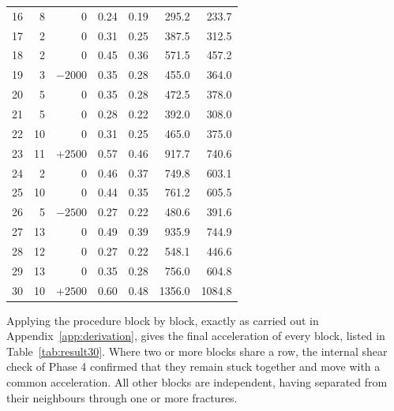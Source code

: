 \documentclass[11pt,a4paper]{article}
\begin{document}
\begin{longtable}{@{}rrrrrrr@{}}
16 & 8 & 0 & 0.24 & 0.19 & 295.2 & 233.7 \\
17 & 2 & 0 & 0.31 & 0.25 & 387.5 & 312.5 \\
18 & 2 & 0 & 0.45 & 0.36 & 571.5 & 457.2 \\
19 & 3 & $-2000$ & 0.35 & 0.28 & 455.0 & 364.0 \\
20 & 5 & 0 & 0.35 & 0.28 & 472.5 & 378.0 \\
21 & 5 & 0 & 0.28 & 0.22 & 392.0 & 308.0 \\
22 & 10 & 0 & 0.31 & 0.25 & 465.0 & 375.0 \\
23 & 11 & $+2500$ & 0.57 & 0.46 & 917.7 & 740.6 \\
24 & 2 & 0 & 0.46 & 0.37 & 749.8 & 603.1 \\
25 & 10 & 0 & 0.44 & 0.35 & 761.2 & 605.5 \\
26 & 5 & $-2500$ & 0.27 & 0.22 & 480.6 & 391.6 \\
27 & 13 & 0 & 0.49 & 0.39 & 935.9 & 744.9 \\
28 & 12 & 0 & 0.27 & 0.22 & 548.1 & 446.6 \\
29 & 13 & 0 & 0.35 & 0.28 & 756.0 & 604.8 \\
30 & 10 & $+2500$ & 0.60 & 0.48 & 1356.0 & 1084.8 \\
\end{longtable}


Applying the procedure block by block, exactly as carried out in Appendix~\ref{app:derivation}, gives the final acceleration of every block, listed in Table~\ref{tab:result30}. Where two or more blocks share a row, the internal shear check of Phase 4 confirmed that they remain stuck together and move with a common acceleration. All other blocks are independent, having separated from their neighbours through one or more fractures.
\end{document}
